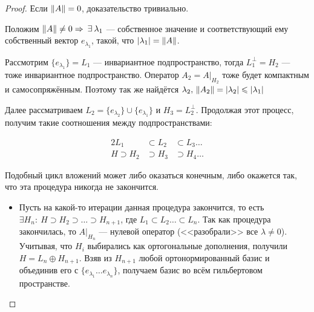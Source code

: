 \documentclass[12pt]{article}
\begin{document}
		\begin{proof}
			Если $\left\| A \right\| = 0$, доказательство тривиально.
		
			Положим $\norm{A} \neq 0 \Rightarrow \exists \lambda_1$ --- собственное значение и соответствующий ему 
			собственный вектор $e_{\lambda_1}$, такой, что $\left| \lambda_1 \right| = \left\| A \right\|$.
		
			Рассмотрим $\{e_{\lambda_1}\} = L_1$ --- инвариантное подпространство, тогда $L_1^{\perp} = H_2$ --- тоже инвариантное 
			подпространство. Оператор $A_2 = A|_{H_2}$ тоже будет компактным и самосопряжённым. Поэтому так же найдётся
			$\lambda_2,\, \left\| A_2 \right\| = \left| \lambda_2 \right| \leqslant \left| \lambda_1 \right|$
		
			Далее рассматриваем $L_2 = \{e_{\lambda_2}\} \cup \{e_{\lambda_1}\}$ и $H_3 = L_2^{\perp}$. Продолжая этот 
			процесс, получим такие соотношения между подпространствами:
		
			\begin{alignat*}{2}
				          L_1 &\subset L_2 &\subset L_3 \dots \\
				H \supset H_2 &\supset H_3 &\supset H_4 \dots
			\end{alignat*}
		
			Подобный цикл вложений может либо оказаться конечным, либо окажется так, что эта процедура никогда не закончится.

			\begin{itemize}
			\item Пусть на какой-то итерации данная процедура закончится, то есть $\exists H_n:\: H \supset H_2 \supset \dots 
				\supset H_{n+1}$,
				где $L_1 \subset L_2 \dots \subset L_n$. Так как процедура закончилась, то $A|_{H_n}$ --- нулевой оператор (<<разобрали>>
				все $\lambda \neq 0$). Учитывая, что $H_i$ выбирались как ортогональные дополнения, получили $H = L_n \oplus H_{n+1}$. 
				Взяв из $H_{n+1}$ любой ортонормированный базис и объединив его с $\{e_{\lambda_1}\ldots e_{\lambda_n}\}$, получаем 
				базис во всём гильбертовом пространстве.
		

\end{itemize}
\end{proof}
\end{document}
